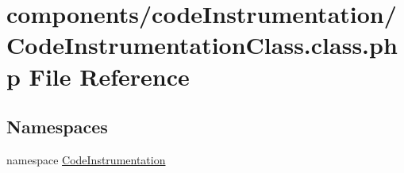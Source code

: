 \hypertarget{_code_instrumentation_class_8class_8php}{
\section{components/codeInstrumentation/CodeInstrumentationClass.class.php File Reference}
\label{_code_instrumentation_class_8class_8php}
}
\subsection*{Namespaces}
\begin{CompactItemize}
\item 
namespace \hyperlink{namespace_code_instrumentation}{CodeInstrumentation}
\end{CompactItemize}
